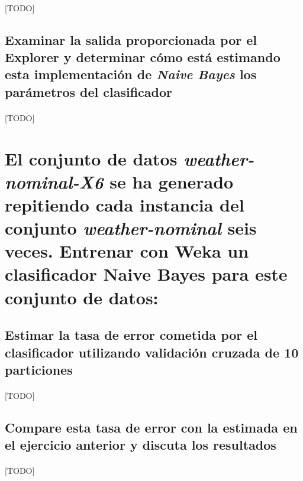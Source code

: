 \documentclass{article}
\begin{document}
			\paragraph{}
			[TODO]

		\subsection{Examinar la salida proporcionada por el Explorer y determinar cómo está estimando esta implementación de \emph{Naive Bayes} los parámetros del clasificador}

			\paragraph{}
			[TODO]

	\section{El conjunto de datos \emph{weather-nominal-X6} se ha generado repitiendo cada instancia del conjunto \emph{weather-nominal} seis veces. Entrenar con Weka un clasificador Naive Bayes para este conjunto de datos:}
	\label{sec:e6}

		\subsection{Estimar la tasa de error cometida por el clasificador utilizando validación cruzada de 10 particiones}

			\paragraph{}
			[TODO]

		\subsection{Compare esta tasa de error con la estimada en el ejercicio anterior y discuta los resultados}

			\paragraph{}
			[TODO]
	\nocite{garciparedes:machine-learning-bayesian-1}
	\nocite{subject:taa}
	\nocite{tool:weka}
  
  
\end{document}
